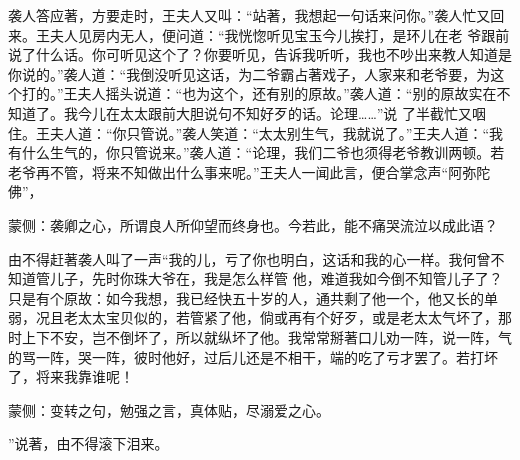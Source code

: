 \begin{parag}
    袭人答应著，方要走时，王夫人又叫：“站著，我想起一句话来问你。”袭人忙又回来。王夫人见房内无人，便问道：“我恍惚听见宝玉今儿挨打，是环儿在老 爷跟前说了什么话。你可听见这个了？你要听见，告诉我听听，我也不吵出来教人知道是你说的。”袭人道：“我倒没听见这话，为二爷霸占著戏子，人家来和老爷要，为这个打的。”王夫人摇头说道：“也为这个，还有别的原故。”袭人道：“别的原故实在不知道了。我今儿在太太跟前大胆说句不知好歹的话。论理……”说 了半截忙又咽住。王夫人道：“你只管说。”袭人笑道：“太太别生气，我就说了。”王夫人道：“我有什么生气的，你只管说来。”袭人道：“论理，我们二爷也须得老爷教训两顿。若老爷再不管，将来不知做出什么事来呢。”王夫人一闻此言，便合掌念声“阿弥陀佛”，\begin{note}蒙侧：袭卿之心，所谓良人所仰望而终身也。今若此，能不痛哭流泣以成此语？\end{note}由不得赶著袭人叫了一声“我的儿，亏了你也明白，这话和我的心一样。我何曾不知道管儿子，先时你珠大爷在，我是怎么样管 他，难道我如今倒不知管儿子了？只是有个原故：如今我想，我已经快五十岁的人，通共剩了他一个，他又长的单弱，况且老太太宝贝似的，若管紧了他，倘或再有个好歹，或是老太太气坏了，那时上下不安，岂不倒坏了，所以就纵坏了他。我常常掰著口儿劝一阵，说一阵，气的骂一阵，哭一阵，彼时他好，过后儿还是不相干，端的吃了亏才罢了。若打坏了，将来我靠谁呢！\begin{note}蒙侧：变转之句，勉强之言，真体贴，尽溺爱之心。\end{note}”说著，由不得滚下泪来。
\end{parag}


